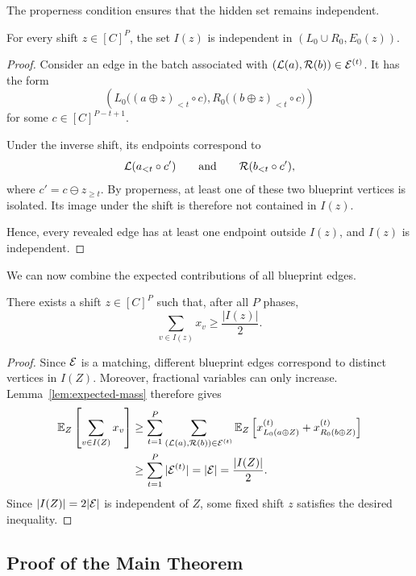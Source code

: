The properness condition ensures that the hidden set remains independent.

\begin{lemma}
\label{lem:hidden-independent}
For every shift $z\in[C]^P$, the set $I(z)$ is independent in $(L_0\cup R_0,E_0(z))$.
\end{lemma}

\begin{proof}
Consider an edge in the batch associated with $(\mathcal{L}(a),\mathcal{R}(b))\in\mathcal{E}^{(t)}$. It has the form
$$
\left(
L_0\bigl((a\oplus z)_{<t}\circ c\bigr),
R_0\bigl((b\oplus z)_{<t}\circ c\bigr)
\right)
$$
for some $c\in[C]^{P-t+1}$.

Under the inverse shift, its endpoints correspond to
$$
\mathcal{L}(a_{<t}\circ c')
\qquad\text{and}\qquad
\mathcal{R}(b_{<t}\circ c'),
$$
where $c'=c\ominus z_{\geq t}$. By properness, at least one of these two blueprint vertices is isolated. Its image under the shift is therefore not contained in $I(z)$.

Hence, every revealed edge has at least one endpoint outside $I(z)$, and $I(z)$ is independent.
\end{proof}

We can now combine the expected contributions of all blueprint edges.

\begin{lemma}
\label{lem:hidden-covered}
There exists a shift $z\in[C]^P$ such that, after all $P$ phases,
$$
\sum_{v\in I(z)}x_v
\geq
\frac{|I(z)|}{2}.
$$
\end{lemma}

\begin{proof}
Since $\mathcal{E}$ is a matching, different blueprint edges correspond to distinct vertices in $I(Z)$. Moreover, fractional variables can only increase. Lemma~\ref{lem:expected-mass} therefore gives
$$
\begin{aligned}
\mathbb{E}_Z
\left[
\sum_{v\in I(Z)}x_v
\right]
&\geq
\sum_{t=1}^P
\sum_{(\mathcal{L}(a),\mathcal{R}(b))\in\mathcal{E}^{(t)}}
\mathbb{E}_Z
\left[
x^{(t)}_{L_0(a\oplus Z)}
+
x^{(t)}_{R_0(b\oplus Z)}
\right] \\
&\geq
\sum_{t=1}^P|\mathcal{E}^{(t)}|
=
|\mathcal{E}|
=
\frac{|I(Z)|}{2}.
\end{aligned}
$$
Since $|I(Z)|=2|\mathcal{E}|$ is independent of $Z$, some fixed shift $z$ satisfies the desired inequality.
\end{proof}

\subsection{Proof of the Main Theorem}

